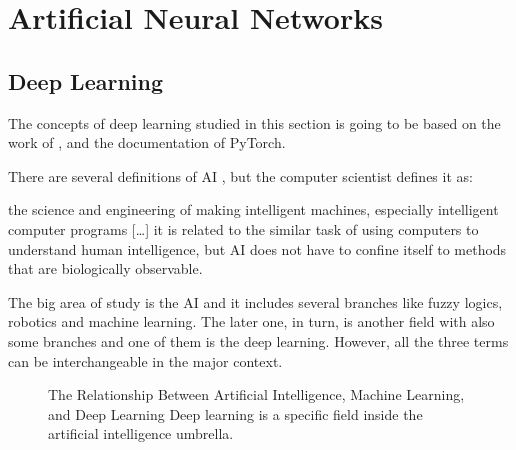 \section{Artificial Neural Networks}\label{sec:ann}

\subsection{Deep Learning}\label{sec:deep_learning}

The concepts of deep learning studied in this section is going to be based on the work of \textcite{goodfellow2016}, \textcite{haykin1999} and the documentation of PyTorch.

There are several definitions of AI \cite{winston1992}, but the  computer scientist \textcite{mccarthy2007} defines it as:
%
\begin{citacao}[english]
    [\ldots] the science and engineering of making intelligent machines, especially intelligent computer programs [\ldots] it is related to the similar task of using computers to understand human intelligence, but AI does not have to confine itself to methods that are biologically observable.
\end{citacao}
The big area of study is the AI and it includes several branches like fuzzy logics, robotics and machine learning.
The later one, in turn, is another field with also some branches and one of them is the deep learning.
However, all the three terms can be interchangeable in the major context.

\begin{figure}[!htb]
    \centering
    \caption[The Relationship Between Artificial Intelligence, Machine Learning, and Deep Learning.]{The Relationship Between Artificial Intelligence, Machine Learning, and Deep Learning Deep learning is a specific field inside the artificial intelligence umbrella.}
    
\end{figure}

